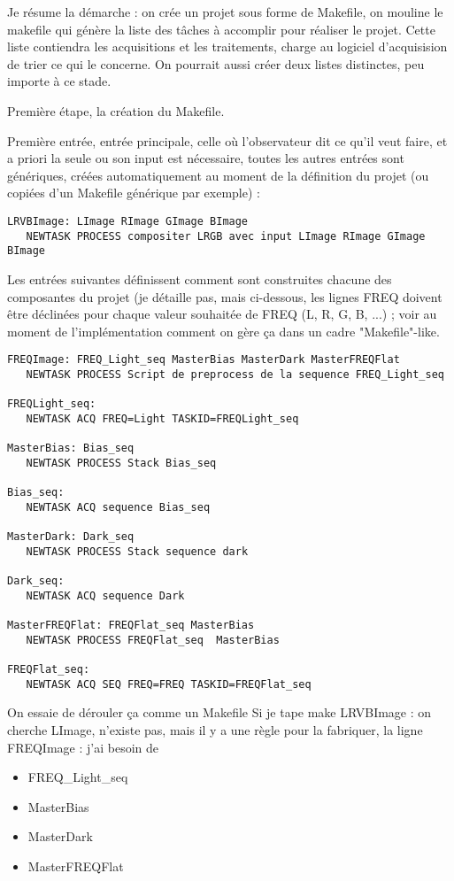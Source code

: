 \documentclass[10pt,a4paper,french]{article}
\newcommand{\bi}{\begin{itemize}}
\newcommand{\ei}{\end{itemize}}
\begin{document}
Je résume la démarche : on crée un projet sous forme de Makefile, on mouline
le makefile qui génère la liste des tâches à accomplir pour réaliser le projet. 
Cette liste contiendra les acquisitions et les traitements, charge au logiciel d'acquisision
de trier ce qui le concerne. On pourrait aussi créer deux listes distinctes, peu importe
à ce stade.

Première étape, la création du Makefile.

Première entrée, entrée principale, celle où l'observateur dit ce qu'il veut faire, et a priori
la seule ou son input est nécessaire, toutes les autres entrées sont génériques, créées
automatiquement au moment de la définition du projet (ou copiées d'un Makefile
générique par exemple) :

\begin{verbatim}
LRVBImage: LImage RImage GImage BImage
   NEWTASK PROCESS compositer LRGB avec input LImage RImage GImage BImage
\end{verbatim}

Les entrées suivantes définissent comment sont construites chacune des composantes
du projet (je détaille pas, mais ci-dessous, les lignes FREQ doivent être déclinées
pour chaque valeur souhaitée de FREQ (L, R, G, B, ...) ; voir au moment de
l'implémentation comment on gère ça dans un cadre "Makefile"-like.

\begin{verbatim}
FREQImage: FREQ_Light_seq MasterBias MasterDark MasterFREQFlat
   NEWTASK PROCESS Script de preprocess de la sequence FREQ_Light_seq

FREQLight_seq:
   NEWTASK ACQ FREQ=Light TASKID=FREQLight_seq

MasterBias: Bias_seq
   NEWTASK PROCESS Stack Bias_seq

Bias_seq: 
   NEWTASK ACQ sequence Bias_seq

MasterDark: Dark_seq
   NEWTASK PROCESS Stack sequence dark
 
Dark_seq:
   NEWTASK ACQ sequence Dark

MasterFREQFlat: FREQFlat_seq MasterBias
   NEWTASK PROCESS FREQFlat_seq  MasterBias

FREQFlat_seq:
   NEWTASK ACQ SEQ FREQ=FREQ TASKID=FREQFlat_seq

\end{verbatim}

On essaie de dérouler ça comme un Makefile 
Si je tape make LRVBImage :
on cherche LImage, n'existe pas, mais il y a une règle pour la fabriquer,
la ligne FREQImage : j'ai besoin de 
\bi
\item FREQ\_Light\_seq
\item MasterBias 
\item MasterDark 
\item MasterFREQFlat
\ei
\end{document}
